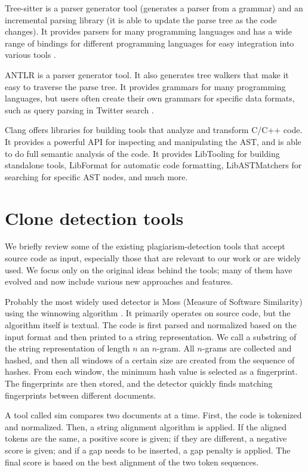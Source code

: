 Tree-sitter \cite{treesitter} is a parser generator tool (generates a parser from a grammar) and an incremental parsing library (it is able to update the parse tree as the code changes).
It provides parsers for many programming languages and has a wide range of bindings for different programming languages for easy integration into various tools \cite{dolos22}.

ANTLR \cite{antlr} is a parser generator tool.
It also generates tree walkers that make it easy to traverse the parse tree.
It provides grammars for many programming languages, but users often create their own grammars for specific data formats, such as query parsing in Twitter search \cite{antlr}.

Clang offers libraries for building tools that analyze and transform C/C++ code.
It provides a powerful API for inspecting and manipulating the AST, and is able to do full semantic analysis of the code.
It provides LibTooling \cite{libtooling} for building standalone tools, LibFormat \cite{libformat} for automatic code formatting, LibASTMatchers \cite{libastmatchers} for searching for specific AST nodes, and much more.

\section{Clone detection tools}

We briefly review some of the existing plagiarism-detection tools that accept source code as input, especially those that are relevant to our work or are widely used.
We focus only on the original ideas behind the tools; many of them have evolved and now include various new approaches and features.

Probably the most widely used detector is Moss (Measure of Software Similarity) using the winnowing algorithm \cite{moss03}.
It primarily operates on source code, but the algorithm itself is textual.
The code is first parsed and normalized based on the input format and then printed to a string representation.
We call a substring of the string representation of length $n$ an $n$-gram.
All $n$-grams are collected and hashed, and then all windows of a certain size are created from the sequence of hashes.
From each window, the minimum hash value is selected as a fingerprint.
The fingerprints are then stored, and the detector quickly finds matching fingerprints between different documents.

A tool called sim \cite{sim99} compares two documents at a time.
First, the code is tokenized and normalized.
Then, a string alignment algorithm is applied.
If the aligned tokens are the same, a positive score is given; if they are different, a negative score is given; and if a gap needs to be inserted, a gap penalty is applied.
The final score is based on the best alignment of the two token sequences.

